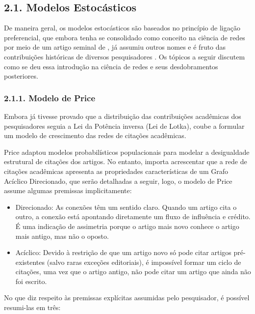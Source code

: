 \documentclass[12pt,oneside,a4paper,brazil,sumario=tradicional]{abntex2}
\begin{document}
\subsection*{2.1. Modelos Estocásticos}
De maneira geral, os modelos estocásticos são baseados no princípio de ligação preferencial, que embora tenha se consolidado como conceito na ciência de redes por meio de um artigo seminal de , já assumiu outros nomes e é fruto das contribuições históricas de diversos pesquisadores \cite{eggenberger1923, yule1925, zipf1949, simon1955}. Os tópicos a seguir discutem como se deu essa introdução na ciência de redes e seus desdobramentos posteriores.

\subsubsection*{2.1.1. Modelo de Price}
Embora  já tivesse provado que a distribuição das contribuições acadêmicas dos pesquisadores seguia a Lei da Potência inversa (Lei de Lotka), coube a  formular um modelo de crescimento das redes de citações acadêmicas.

Price adaptou modelos probabilísticos populacionais para modelar a desigualdade estrutural de citações dos artigos. No entanto, importa acrescentar que a rede de citações acadêmicas apresenta as propriedades características de um Grafo Acíclico Direcionado, que serão detalhadas a seguir, logo, o modelo de Price assume algumas premissas implicitamente:

\begin{itemize}
  \item Direcionado: As conexões têm um sentido claro. Quando um artigo cita o outro, a conexão está apontando diretamente um fluxo de influência e crédito. É  uma indicação de assimetria porque o artigo mais novo conhece o artigo mais antigo, mas não o oposto.
  \item Acíclico: Devido à restrição de que um artigo novo só pode citar artigos pré-existentes (salvo raras exceções editoriais), é impossível formar um ciclo de citações, uma vez que o artigo antigo, não pode citar um artigo que ainda não foi escrito.
\end{itemize}
No que diz respeito às premissas explícitas assumidas pelo pesquisador, é possível resumi-las em três:
\end{document}

